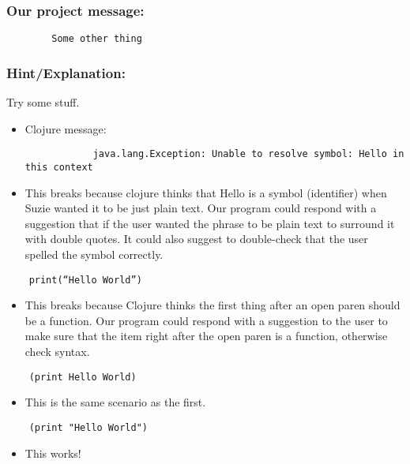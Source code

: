 \documentclass[12pt]{article}
\begin{document}
\subsubsection*{Our project message:}
\begin{verbatim}
		Some other thing
\end{verbatim}
\subsubsection*{Hint/Explanation:}
Try some stuff.
		
		
		
		
\begin{itemize}
	\item Clojure message: 
		\begin{verbatim}
			java.lang.Exception: Unable to resolve symbol: Hello in this context
		\end{verbatim}
	\item This breaks because clojure thinks that Hello is a symbol (identifier) when Suzie wanted it to be just plain text. Our program could respond with a suggestion that if the user wanted the phrase to be plain text to surround it with double quotes. It could also suggest to double-check that the user spelled the symbol correctly. 
\end{itemize}

\begin{verbatim}
	print(“Hello World”)
\end{verbatim}
\begin{itemize}
	\item This breaks because Clojure thinks the first thing after an open paren should be a function. Our program could respond with a suggestion to the user to make sure that the item right after the open paren is a function, otherwise check syntax. 
\end{itemize}

\begin{verbatim}
	(print Hello World)
\end{verbatim}
\begin{itemize}
	\item This is the same scenario as the first.
\end{itemize}

\begin{verbatim}
	(print "Hello World")
\end{verbatim}
\begin{itemize}
	\item This works!
\end{itemize}
\end{document}

